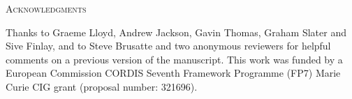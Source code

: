 \documentclass[12pt,letterpaper]{article}
\renewcommand{\section}[1]{%
\bigskip
\begin{center}
\begin{Large}
\normalfont\scshape #1
\medskip
\end{Large}
\end{center}}
\begin{document}

\section{Acknowledgments}
Thanks to Graeme Lloyd, Andrew Jackson, Gavin Thomas, Graham Slater and Sive Finlay, and to Steve Brusatte and two anonymous reviewers for helpful comments on a previous version of the manuscript. 
This work was funded by a European Commission CORDIS Seventh Framework Programme (FP7) Marie Curie CIG grant (proposal number: 321696).




\end{document}

